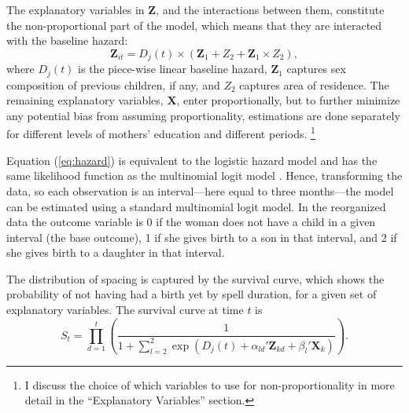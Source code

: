 \documentclass[12pt,letterpaper]{article}
\begin{document}
The explanatory variables in $\mathbf{Z}$, and the interactions between them, 
constitute the non-proportional part of the model, which means that they are
interacted with the baseline hazard:
\begin{equation}
 \mathbf{Z}_{it} = D_j(t) \times (\mathbf{Z}_1 + Z_2 + \mathbf{Z}_1 \times Z_2),
\end{equation}
where $D_j(t)$ is the piece-wise linear baseline hazard, $\mathbf{Z}_1$ captures sex 
composition of previous children, if any, and $Z_2$ captures area of residence.
The remaining explanatory variables, $\mathbf{X}$, enter proportionally,
but to further minimize any potential bias from assuming proportionality, estimations 
are done separately for different levels of mothers' education and different 
periods.%
\footnote{
I discuss the choice of which variables to use for non-proportionality in more detail
in the ``Explanatory Variables'' section.
}

Equation (\ref{eq:hazard}) is equivalent to the logistic hazard model and has the same 
likelihood function as the multinomial logit model \citep{allison82,jenkins95}.
Hence, transforming the data, so each observation is an interval---here equal
to three months---the model can be estimated using a standard multinomial logit model.
%
In the reorganized data the outcome variable is 0 if the woman does not have a child in a 
given interval (the base outcome), 1 if she gives birth to a son in that interval, and 2 
if she gives birth to a daughter in that interval.

The distribution of spacing is captured by the survival curve, which shows the probability 
of not having had a birth yet by spell duration, for a given set of explanatory variables.
The survival curve at time $t$ is 
\begin{equation}
\label{eq:survival}
S_{t} 
= 
\prod_{d=1}^t
\left(
\frac{ 1 }
{1 + \sum_{l=2}^2 \exp(D_j(t) + \alpha_{ld}'\mathbf{Z}_{kd} + \beta_l'\mathbf{X}_{k})}
\right).
\end{equation}
\end{document}
